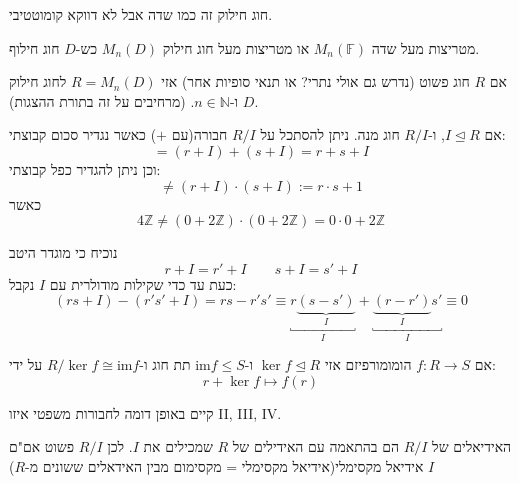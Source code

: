 \documentclass{tstextbook}
\begin{document}
\begin{remark}
חוג חילוק זה כמו שדה אבל לא דווקא קומוטטיבי.

\end{remark}
\begin{example}
מטריצות מעל שדה \(M_{n}(\mathbb{F})\) או מטריצות מעל חוג חילוק \(M_{n}(D)\) כש-\(D\) חוג חילוף.

\end{example}
\begin{theorem}
אם \(R\) חוג פשוט (נדרש גם אולי נתרי? או תנאי סופיות אחר) אזי \(R=M_{n}(D)\) לחוג חילוק \(D\) ו-\(n \in \mathbb{N}\).
(מרחיבים על זה בתורת ההצגות).

\end{theorem}
אם \(I\trianglelefteq R\), ו-\(R / I\) חוג מנה. ניתן להסתכל על \(R / I\) חבורה(עם \(+\)) כאשר נגדיר סכום קבוצתי:
$$=(r+I)+(s+I)=r+s+I$$
וכן ניתן להגדיר כפל קבוצתי:
$$\neq(r+I)\cdot (s+I):= r\cdot s +1$$
כאשר 
$$4\mathbb{Z}\neq (0+2\mathbb{Z})\cdot(0+2\mathbb{Z})=0\cdot 0+2\mathbb{Z}$$

נוכיח כי מוגדר היטב
$$r+I=r'+I\qquad s+I=s'+I$$
כעת עד כדי שקילות מודולרית עם \(I\) נקבל:
$$(rs+I)-(r's'+I)=rs-r's'\equiv \underbracket{ r\underbrace{ (s-s') }_{ I } }_{ I }+\underbracket{ \underbrace{ (r-r') }_{ I }s' }_{ I }\equiv 0$$

\begin{theorem}[איזו I]
אם \(f:R\to S\) הומומורפיזם אזי \(\ker f \trianglelefteq R\) ו-\(\mathrm{im}f\leq S\) תת חוג ו-\(R / \ker f \cong \mathrm{im}f\) על ידי:
$$r+\ker f \mapsto f(r)$$

\end{theorem}
קיים באופן דומה לחבורות משפטי איזו II, III, IV.

האידיאלים של \(R / I\) הם בהתאמה עם האידילים של \(R\) שמכילים את \(I\). לכן \(R / I\) פשוט אם"ם \(I\) אידיאל מקסימלי(אידיאל מקסימלי = מקסימום מבין האידאלים ששונים מ-\(R\))
\end{document}
